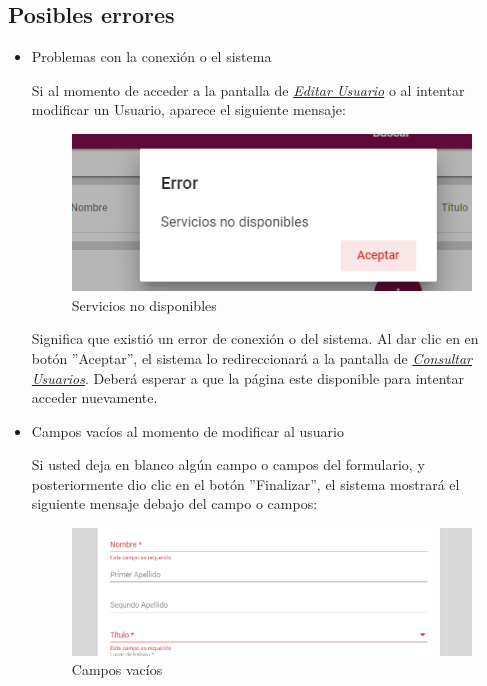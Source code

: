                 \subsection{Posibles errores}
                    \begin{itemize}
                        \item Problemas con la conexión o el sistema
                    
                            Si al momento de acceder a la pantalla de \hyperlink{editarUs}{\textit{Editar Usuario}} o al intentar modificar un Usuario, aparece el siguiente mensaje:
                            \clearpage
                            \begin{figure}[!hbtp]
                            	\centering
                            	\includegraphics[width=0.4\linewidth]{images/SP5/MSGSN}
                            	\caption{Servicios no disponibles}
                            	
                            \end{figure}
                           
                        
                            Significa que existió un error de conexión o del sistema. Al dar clic en en botón ''Aceptar'', el sistema lo redireccionará  a la pantalla de \hyperlink{consultarUs}{\textit{Consultar Usuarios}}. Deberá esperar a que la página este disponible para intentar acceder nuevamente.
                    
                        \item Campos vacíos al momento de modificar al usuario
                    
                            Si usted deja en blanco algún campo o campos del formulario, y posteriormente dio clic en el botón ''Finalizar'', el sistema mostrará el siguiente mensaje debajo del campo o campos:
                           
                          \begin{figure}[!hbtp]
                         	\centering
                         	\includegraphics[width=0.4\linewidth]{images/SP5/MSG44}
                         	\caption{Campos vacíos}
                         	\label{mensaje44}
                         

\end{figure}
\end{itemize}
